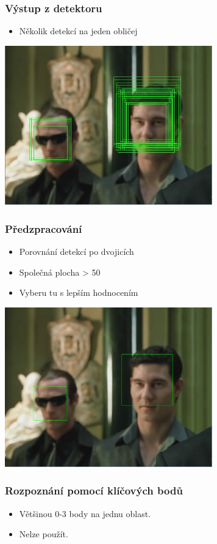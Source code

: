\documentclass{beamer}
\begin{document}
	\begin{frame}[t,fragile]
		\frametitle{Výstup z detektoru}	
		
		\begin{itemize}
			\item Několik detekcí na jeden obličej
		\end{itemize}			
	    \centering\includegraphics[width=9cm]{img/detections.jpg}
	\end{frame}		
	\begin{frame}[t,fragile]
		\frametitle{Předzpracování}	
		
		\begin{itemize}
			\item Porovnání detekcí po dvojicích
			\item Společná plocha > 50%
			\item Vyberu tu s lepším hodnocením
		\end{itemize}			
	    \centering\includegraphics[width=9cm]{img/sepDet.jpg}
	\end{frame}	
	\begin{frame}[t,fragile]
		\frametitle{Rozpoznání pomocí klíčových bodů}	
		
		\begin{itemize}
			\item Většinou 0-3 body na jednu oblast.
			\item Nelze použít.
		\end{itemize}			
	\end{frame}				
\end{document}

